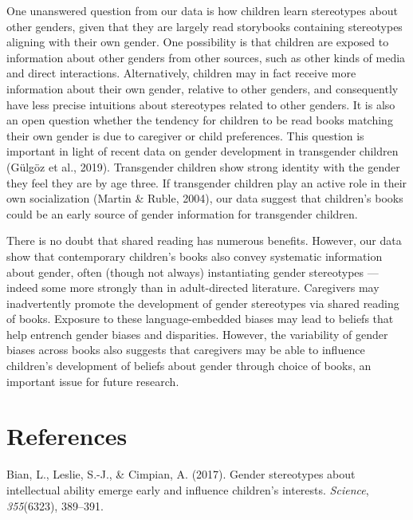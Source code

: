 \documentclass[
  english,
  ,man,floatsintext]{apa6}
\begin{document}
One unanswered question from our data is how children learn stereotypes about other genders, given that they are largely read storybooks containing stereotypes aligning with their own gender. One possibility is that children are exposed to information about other genders from other sources, such as other kinds of media and direct interactions. Alternatively, children may in fact receive more information about their own gender, relative to other genders, and consequently have less precise intuitions about stereotypes related to other genders. It is also an open question whether the tendency for children to be read books matching their own gender is due to caregiver or child preferences. This question is important in light of recent data on gender development in transgender children (Gülgöz et al., 2019). Transgender children show strong identity with the gender they feel they are by age three. If transgender children play an active role in their own socialization (Martin \& Ruble, 2004), our data suggest that children's books could be an early source of gender information for transgender children.

There is no doubt that shared reading has numerous benefits. However, our data show that contemporary children's books also convey systematic information about gender, often (though not always) instantiating gender stereotypes --- indeed some more strongly than in adult-directed literature. Caregivers may inadvertently promote the development of gender stereotypes via shared reading of books. Exposure to these language-embedded biases may lead to beliefs that help entrench gender biases and disparities. However, the variability of gender biases across books also suggests that caregivers may be able to influence children's development of beliefs about gender through choice of books, an important issue for future research.

\newpage

\hypertarget{references}{%
\section{References}\label{references}}

\setlength{\parindent}{-0.5in}
\setlength{\leftskip}{0.5in}

\hypertarget{refs}{}
\leavevmode\hypertarget{ref-bian2017gender}{}%
Bian, L., Leslie, S.-J., \& Cimpian, A. (2017). Gender stereotypes about intellectual ability emerge early and influence children's interests. \emph{Science}, \emph{355}(6323), 389--391.
\end{document}
